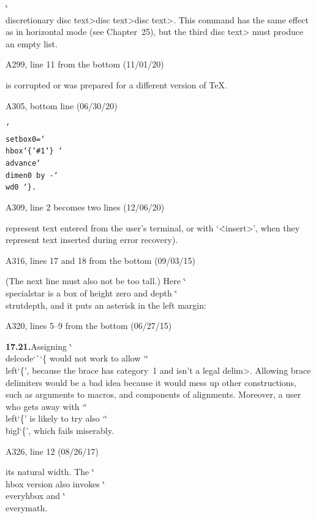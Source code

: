 \ninepoint
\textindent{$\bull$} \.{\char`\\discretionary}%
  \<disc text>\<disc text>\<disc text>.\enskip
This command has the same effect as in horizontal mode (see Chapter~25), but the
third \<disc text> must produce an empty list.

\bugonpage A299, line 11 from the bottom (11/01/20)

\ninepoint\noindent
is corrupted or was prepared for a different version of \TeX.

\bugonpage A305, bottom line (06/30/20)

\ninepoint\indent
\tt \char`\\setbox0=\char`\\hbox\char`\{\char`\#1\char`\}%
\char`\\advance\char`\\dimen0 by -\char`\\wd0 \char`\}\rm.

\bugonpage A309, line 2 becomes two lines (12/06/20)

\ninepoint\noindent
represent text entered from the user's terminal, or with
`\.{<insert>}', when they
represent text inserted during error recovery).

\bugonpage A316, lines 17 and 18 from the bottom (09/03/15)

\ninepoint\noindent
(The next line must also not be too tall.)
Here \.{\char`\\specialstar} is a box of height zero and depth
\.{\char`\\strutdepth},
and it puts an asterisk in the left margin:

\bugonpage A320, lines 5--9 from the bottom (06/27/15)

\ninepoint\noindent
{\bf 17.21.}\enspace Assigning \.{\char`\\delcode\char`\`\char`\{}
would not work to allow `\.{\char`\\left\char`\{}', because
the brace has category~1 and isn't a legal \<delim>.
Allowing brace delimiters would be a bad idea because it would
mess up other constructions, such as arguments to macros, and
components of alignments. Moreover, a user who
gets away with `\.{\char`\\left\char`\{}'
is likely to try also `\.{\char`\\bigl\char`\{}', which
fails miserably.

\bugonpage A326, line 12 (08/26/17)

\ninepoint\noindent
its natural width. The \.{\char`\\hbox} version also invokes
\.{\char`\\everyhbox} and \.{\char`\\everymath}.

